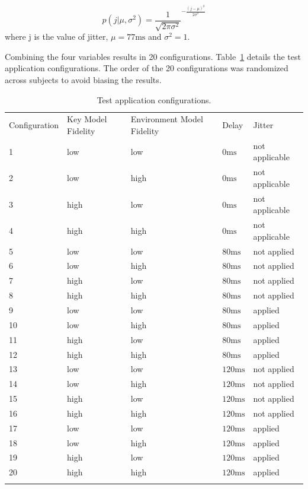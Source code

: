 \begin{equation}
\label{equ:jitter}
p(j|\mu,\sigma^{2})=\frac{1}{\sqrt{2\pi\sigma^{2}}}^{-\frac{(j-\mu)^{2}}{2\sigma^{2}}}
\end{equation}
where j is the value of jitter, $\mu=77\mathrm{ms}$ and $\sigma^{2}=1$.

Combining the four variables results in 20 configurations. Table~\ref{tab:pus} details the test application configurations. The order of the 20 configurations was randomized across subjects to avoid biasing the results.

\begin{table}[!htbp]
\caption{Test application configurations.}
\label{tab:pus}
\begin{tabular}{lllll}
\hline\noalign{\smallskip}
Configuration & Key Model Fidelity & Environment Model Fidelity & Delay & Jitter \\
\noalign{\smallskip}\hline\noalign{\smallskip}
1 & low & low & $0\mathrm{ms}$ & not applicable \\
2 & low & high & $0\mathrm{ms}$ & not applicable \\
3 & high & low & $0\mathrm{ms}$ & not applicable \\
4 & high & high & $0\mathrm{ms}$ & not applicable \\
5 & low & low & $80\mathrm{ms}$ & not applied \\
6 & low & high & $80\mathrm{ms}$ & not applied \\
7 & high & low & $80\mathrm{ms}$ & not applied \\
8 & high & high & $80\mathrm{ms}$ & not applied \\
9 & low & low & $80\mathrm{ms}$ & applied \\
10 & low & high & $80\mathrm{ms}$ & applied \\
11 & high & low & $80\mathrm{ms}$ & applied \\
12 & high & high & $80\mathrm{ms}$ & applied \\
13 & low & low & $120\mathrm{ms}$ & not applied \\
14 & low & high & $120\mathrm{ms}$ & not applied \\
15 & high & low & $120\mathrm{ms}$ & not applied \\
16 & high & high & $120\mathrm{ms}$ & not applied \\
17 & low & low & $120\mathrm{ms}$ & applied \\
18 & low & high & $120\mathrm{ms}$ & applied \\
19 & high & low & $120\mathrm{ms}$ & applied \\
20 & high & high & $120\mathrm{ms}$ & applied \\
\noalign{\smallskip}\hline
\end{tabular}
\end{table}


